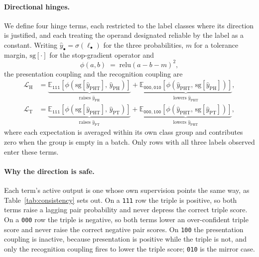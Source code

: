 \documentclass[webpdf,modern,large,namedate]{oup-authoring-template}
\theoremstyle{thmstyleone}
\theoremstyle{thmstyletwo}
\theoremstyle{thmstylethree}
\newcommand{\PHm}{\mathrm{PH}}
\newcommand{\PTm}{\mathrm{PT}}
\newcommand{\PHTm}{\mathrm{PHT}}
\newcommand{\sg}{\mathrm{sg}}
\newcommand{\relu}{\mathrm{relu}}
\begin{document}
\paragraph{Directional hinges.}
We define four hinge terms, each restricted to the label classes where its
direction is justified, and each treating the operand designated reliable by
the label as a constant. Writing $\hat y_\bullet=\sigma(\ell_\bullet)$ for the
three probabilities, $m$ for a tolerance margin, $\sg[\cdot]$ for the
stop-gradient operator and
\begin{equation}
\phi(a,b)\;=\;\relu\!\left(a-b-m\right)^{2},
\label{eq:hinge}
\end{equation}
the presentation coupling and the recognition coupling are
\begin{align}
\mathcal{L}_{\mathrm{H}} &=
\underbrace{\mathbb{E}_{\mathtt{111}}\!\left[\phi\!\left(\sg[\hat y_{\PHTm}],\,
\hat y_{\PHm}\right)\right]}_{\text{raises }\hat y_{\PHm}}
+\underbrace{\mathbb{E}_{\mathtt{000},\mathtt{010}}\!\left[\phi\!\left(
\hat y_{\PHTm},\,\sg[\hat y_{\PHm}]\right)\right]}_{\text{lowers }\hat y_{\PHTm}},
\label{eq:lh}\\
\mathcal{L}_{\mathrm{T}} &=
\underbrace{\mathbb{E}_{\mathtt{111}}\!\left[\phi\!\left(\sg[\hat y_{\PHTm}],\,
\hat y_{\PTm}\right)\right]}_{\text{raises }\hat y_{\PTm}}
+\underbrace{\mathbb{E}_{\mathtt{000},\mathtt{100}}\!\left[\phi\!\left(
\hat y_{\PHTm},\,\sg[\hat y_{\PTm}]\right)\right]}_{\text{lowers }\hat y_{\PHTm}},
\label{eq:lt}
\end{align}
where each expectation is averaged within its own class group and contributes
zero when the group is empty in a batch. Only rows with all three labels
observed enter these terms.

\paragraph{Why the direction is safe.}
Each term's active output is one whose own supervision points the same way, as
Table~\ref{tab:consistency} sets out. On a \texttt{111} row the triple is
positive, so both terms raise a lagging pair probability and never depress the
correct triple score. On a \texttt{000} row the triple is negative, so both
terms lower an over-confident triple score and never raise the correct negative
pair scores. On \texttt{100} the presentation coupling is inactive, because
presentation is positive while the triple is not, and only the recognition
coupling fires to lower the triple score; \texttt{010} is the mirror case.
\end{document}
